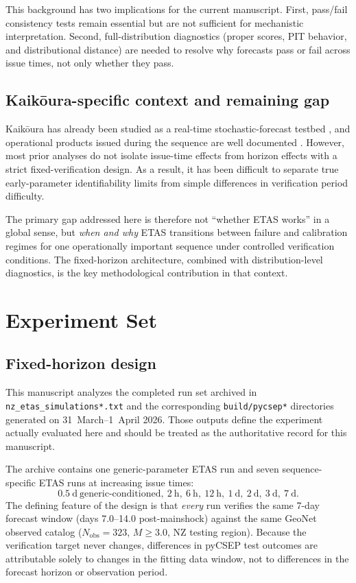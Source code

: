 \documentclass[12pt,letterpaper]{article}
\begin{document}
This background has two implications for the current manuscript.
First, pass/fail consistency tests remain essential but are not sufficient for
mechanistic interpretation. Second, full-distribution diagnostics (proper
scores, PIT behavior, and distributional distance) are needed to resolve
why forecasts pass or fail across issue times, not only whether they pass.

\subsection{Kaik\={o}ura-specific context and remaining gap}

Kaik\={o}ura has already been studied as a real-time stochastic-forecast testbed
\cite{harte2019}, and operational products issued during the sequence are
well documented \cite{rhoades2017,becker2020kaikoura}. However, most prior
analyses do not isolate issue-time effects from horizon effects with a strict
fixed-verification design. As a result, it has been difficult to separate
true early-parameter identifiability limits from simple differences in
verification period difficulty.

The primary gap addressed here is therefore not ``whether ETAS works'' in a
global sense, but \emph{when and why} ETAS transitions between failure and
calibration regimes for one operationally important sequence under controlled
verification conditions. The fixed-horizon architecture, combined with
distribution-level diagnostics, is the key methodological contribution in that
context.

\section{Experiment Set}

\subsection{Fixed-horizon design}

This manuscript analyzes the completed run set archived in
\texttt{nz\_etas\_simulations*.txt} and the corresponding
\texttt{build/pycsep*} directories generated on 31~March--1~April 2026. Those
outputs define the experiment actually evaluated here and should be treated as
the authoritative record for this manuscript.

The archive contains one generic-parameter ETAS run and seven sequence-specific
ETAS runs at increasing issue times:
\[
0.5~\mathrm{d\ generic\text{-}conditioned},\ 2~\mathrm{h},\ 6~\mathrm{h},\
12~\mathrm{h},\ 1~\mathrm{d},\ 2~\mathrm{d},\ 3~\mathrm{d},\ 7~\mathrm{d}.
\]
The defining feature of the design is that \emph{every} run verifies the same
7-day forecast window (days 7.0--14.0 post-mainshock) against the same GeoNet
observed catalog ($N_{\mathrm{obs}}=323$, $M\geq3.0$, NZ testing region).
Because the verification target never changes, differences in pyCSEP test
outcomes are attributable solely to changes in the fitting data window, not
to differences in the forecast horizon or observation period.
\end{document}
